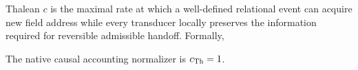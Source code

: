\setcounter{theorem}{0}
\begin{definition}
Thalean $c$ is the maximal rate at which a well-defined relational event can acquire new field address while every transducer locally preserves the information required for reversible admissible handoff. Formally,

The native causal accounting normalizer is $c_{\mathrm{Th}}=1$.
\end{definition}
